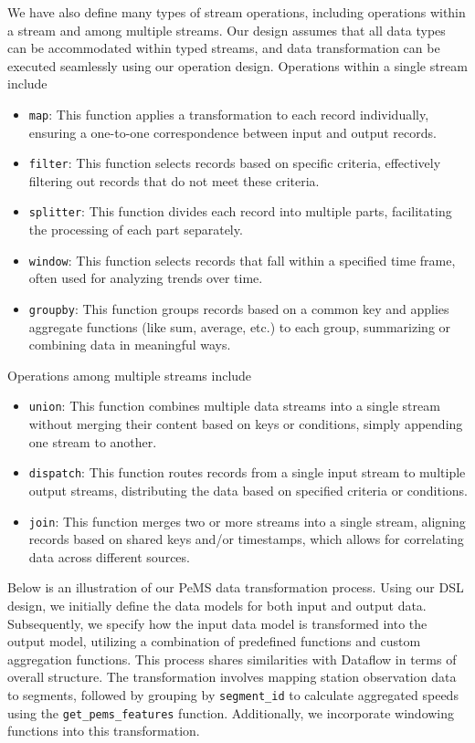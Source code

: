 We have also define many types of stream operations, including operations within a stream and among multiple streams. Our design assumes that all data types can be accommodated within typed streams, and data transformation can be executed seamlessly using our operation design. Operations within a single stream include 
\begin{itemize}
    \item {\tt map}: This function applies a transformation to each record individually, ensuring a one-to-one correspondence between input and output records.
    \item {\tt filter}: This function selects records based on specific criteria, effectively filtering out records that do not meet these criteria.
    \item {\tt splitter}: This function divides each record into multiple parts, facilitating the processing of each part separately.
    \item {\tt window}: This function selects records that fall within a specified time frame, often used for analyzing trends over time.
    \item {\tt groupby}: This function groups records based on a common key and applies aggregate functions (like sum, average, etc.) to each group, summarizing or combining data in meaningful ways.
\end{itemize}
Operations among multiple streams include 
\begin{itemize}
    \item {\tt union}: This function combines multiple data streams into a single stream without merging their content based on keys or conditions, simply appending one stream to another.
    \item {\tt dispatch}: This function routes records from a single input stream to multiple output streams, distributing the data based on specified criteria or conditions.
    \item {\tt join}: This function merges two or more streams into a single stream, aligning records based on shared keys and/or timestamps, which allows for correlating data across different sources.
\end{itemize}

Below is an illustration of our PeMS data transformation process. Using our DSL design, we initially define the data models for both input and output data. Subsequently, we specify how the input data model is transformed into the output model, utilizing a combination of predefined functions and custom aggregation functions. This process shares similarities with Dataflow in terms of overall structure. The transformation involves mapping station observation data to segments, followed by grouping by {\tt segment\_id} to calculate aggregated speeds using the {\tt get\_pems\_features} function. Additionally, we incorporate windowing functions into this transformation.

